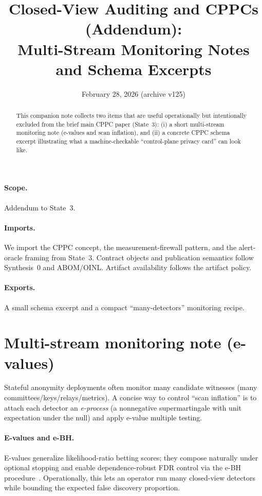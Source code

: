 \documentclass[11pt]{article}
\title{Closed-View Auditing and CPPCs (Addendum):\\Multi-Stream Monitoring Notes and Schema Excerpts}
\author{}
\date{February 28, 2026 (archive v125)}
\theoremstyle{definition}
\theoremstyle{remark}
\begin{document}
\maketitle

\begin{abstract}
This companion note collects two items that are useful operationally but intentionally excluded from the brief main CPPC paper (State~3):
(i) a short multi-stream monitoring note (e-values and scan inflation), and
(ii) a concrete CPPC schema excerpt illustrating what a machine-checkable ``control-plane privacy card'' can look like.
\end{abstract}

\paragraph{Scope.}
Addendum to State~3.\cite{series:state3}

\paragraph{Imports.}
We import the CPPC concept, the measurement-firewall pattern, and the alert-oracle framing from State~3.\cite{series:state3}
Contract objects and publication semantics follow Synthesis~0 and ABOM/OINL.\cite{series:contractobjects,series:abomoinl}
Artifact availability follows the artifact policy.\cite{series:artifactpolicy}

\paragraph{Exports.}
A small schema excerpt and a compact ``many-detectors'' monitoring recipe.

\appendix


\section{Multi-stream monitoring note (e-values)}
\label{app:multi}
Stateful anonymity deployments often monitor many candidate witnesses (many committees/keys/relays/metrics).
A concise way to control ``scan inflation'' is to attach each detector an \emph{e-process} (a nonnegative supermartingale with unit expectation under the null) and apply e-value multiple testing.

\paragraph{E-values and e-BH.}
E-values generalize likelihood-ratio betting scores; they compose naturally under optional stopping and enable dependence-robust FDR control via the e-BH procedure~\cite{ramdas2024evalues,wang2022ebh}.
Operationally, this lets an operator run many closed-view detectors while bounding the expected false discovery proportion.
\end{document}
